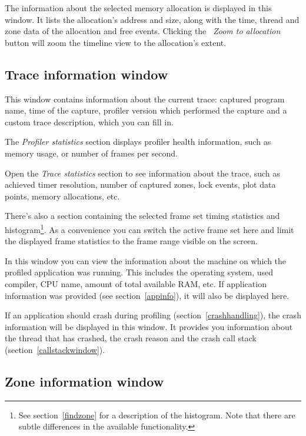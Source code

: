 \documentclass[hidelinks,titlepage,a4paper]{article}
\begin{document}
The information about the selected memory allocation is displayed in this window. It lists the allocation's address and size, along with the time, thread and zone data of the allocation and free events. Clicking the \emph{\faMicroscope{}~Zoom to allocation} button will zoom the timeline view to the allocation's extent.

\subsection{Trace information window}
\label{traceinfo}

This window contains information about the current trace: captured program name, time of the capture, profiler version which performed the capture and a custom trace description, which you can fill in.

The \emph{Profiler statistics} section displays profiler health information, such as memory usage, or number of frames per second.

Open the \emph{Trace statistics} section to see information about the trace, such as achieved timer resolution, number of captured zones, lock events, plot data points, memory allocations, etc.

There's also a section containing the selected frame set timing statistics and histogram\footnote{See section~\ref{findzone} for a description of the histogram. Note that there are subtle differences in the available functionality.}. As a convenience you can switch the active frame set here and limit the displayed frame statistics to the frame range visible on the screen.

In this window you can view the information about the machine on which the profiled application was running. This includes the operating system, used compiler, CPU name, amount of total available RAM, etc. If application information was provided (see section~\ref{appinfo}), it will also be displayed here.

If an application should crash during profiling (section~\ref{crashhandling}), the crash information will be displayed in this window. It provides you information about the thread that has crashed, the crash reason and the crash call stack (section~\ref{callstackwindow}).

\subsection{Zone information window}
\label{zoneinfo}
\end{document}
